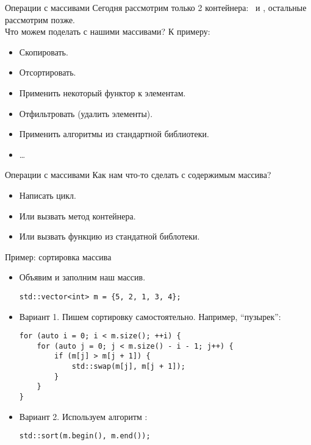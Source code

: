\documentclass{beamer}
\begin{document}
\begin{frame}[fragile]{Операции с массивами}
    Сегодня рассмотрим только 2 контейнера:~ и , остальные рассмотрим позже.\\
    Что можем поделать с нашими массивами? К примеру:
    \begin{itemize}
        \item Скопировать.
        \item Отсортировать.
        \item Применить некоторый функтор к элементам.
        \item Отфильтровать (удалить элементы).
        \item Применить алгоритмы из стандартной библиотеки.
        \item \dots
    \end{itemize}
\end{frame}

\begin{frame}[fragile]{Операции с массивами}
    Как нам что-то сделать с содержимым массива?
    \begin{itemize}
        \item Написать цикл.
        \item Или вызвать метод контейнера.
        \item Или вызвать функцию из стандатной библотеки.
    \end{itemize}
\end{frame}

\begin{frame}[fragile]{Пример: сортировка массива}
    \begin{itemize}
        \item Объявим и заполним наш массив.
            \begin{lstlisting}
std::vector<int> m = {5, 2, 1, 3, 4};
            \end{lstlisting}
        \item Вариант 1. Пишем сортировку самостоятельно. Например, \enquote{пузырек}:
            \begin{lstlisting}
for (auto i = 0; i < m.size(); ++i) {
    for (auto j = 0; j < m.size() - i - 1; j++) {
        if (m[j] > m[j + 1]) {
            std::swap(m[j], m[j + 1]);
        }
    }
}
            \end{lstlisting}
        \item Вариант 2. Используем алгоритм :
            \begin{lstlisting}
std::sort(m.begin(), m.end());
            \end{lstlisting}
    \end{itemize}
\end{frame}
\end{document}
